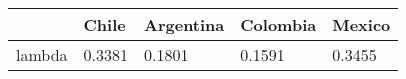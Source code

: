 \begin{table}[ht]
\centering
\begin{tabular}{rllll}
  \hline
 & Chile & Argentina & Colombia & Mexico \\ 
  \hline
lambda & 0.3381 & 0.1801 & 0.1591 & 0.3455 \\ 
   \hline
\end{tabular}
\end{table}
